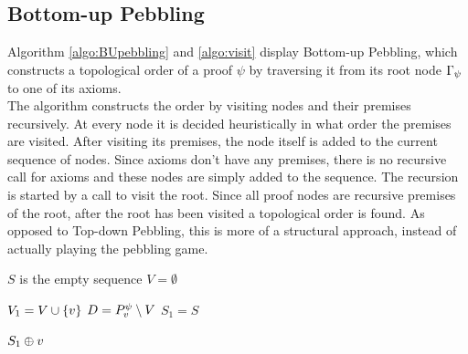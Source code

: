 \documentclass{llncs}
\begin{document}
\subsection{Bottom-up Pebbling}

Algorithm \ref{algo:BUpebbling} and \ref{algo:visit} display Bottom-up Pebbling, which constructs a topological order of a proof $\psi$ by traversing it from its root node $\Gamma_{\psi}$ to one of its axioms.\\
The algorithm constructs the order by visiting nodes and their premises recursively. 
At every node it is decided heuristically in what order the premises are visited.
After visiting its premises, the node itself is added to the current sequence of nodes.
Since axioms don't have any premises, there is no recursive call for axioms and these nodes are simply added to the sequence.
The recursion is started by a call to visit the root.
Since all proof nodes are recursive premises of the root, after the root has been visited a topological order is found.
As opposed to Top-down Pebbling, this is more of a structural approach, instead of actually playing the pebbling game.


\begin{algorithm}[h]
  \BlankLine

	$S$ is the empty sequence\;
	$V = \emptyset$\;
	\Return {}\;

  \caption[.]{}
  \label{algo:BUpebbling}
\end{algorithm}

\begin{algorithm}[h]
	
	$V_1 = V \cup \{v\}$\;
	$D = P_{v}^{\psi} \setminus V$\;
	$S_1 = S$
	
	
	\Return $S_1 \oplus v$\;
	
  \caption[.]{}
  \label{algo:visit}
\end{algorithm}
\end{document}
